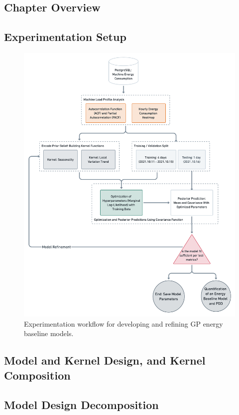 \subsection{Chapter Overview}

\subsection{Experimentation Setup}

\begin{figure}[H]
\centering
\graphicspath{ {./images/} }
\includegraphics[scale=0.17]{images/experiment_flow.png}
\caption{Experimentation workflow for developing and refining GP energy baseline models.}
\end{figure}

\subsection{Model and Kernel Design, and Kernel Composition}

\subsection{Model Design Decomposition}

